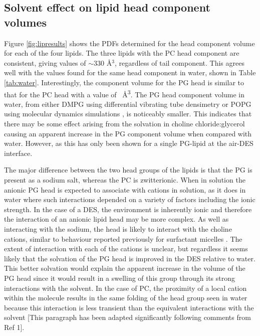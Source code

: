 \documentclass[amsmath,amssymb,twocolumn,superscriptaddress]{revtex4-1}
\begin{document}
\subsection{Solvent effect on lipid head component volumes}
%
Figure \ref{fig:lipresults} shows the PDFs determined for the head component volume for each of the four lipids.
The three lipids with the PC head component are consistent, giving values of $\sim330$ \AA$^3$, regardless of tail component.
This agrees well with the values found for the same head component in water, shown in Table \ref{tab:water}.
Interestingly, the component volume for the PG head is similar to that for the PC head with a value of ~\si{\angstrom\cubed}.
The PG head component volume in water, from either DMPG using differential vibrating tube densimetry \cite{pan_molecular_2012} or POPG using molecular dynamics simulations \cite{kucerka_scattering_2012}, is noticeably smaller.
This indicates that there may be some effect arising from the solvation in choline chloride:glycerol causing an apparent increase in the PG component volume when compared with water.
However, as this has only been shown for a single PG-lipid at the air-DES interface.

The major difference between the two head groups of the lipids is that the PG is present as a sodium salt, whereas the PC is zwitterionic.
When in solution the anionic PG head is expected to associate with cations in solution, as it does in water \cite{grigoriev_effect_1999} where such interactions depended on a variety of factors including the ionic strength.
In the case of a DES, the environment is inherently ionic and therefore the interaction of an anionic lipid head may be more complex.
As well as interacting with the sodium, the head is likely to interact with the choline cations, similar to behaviour reported previously for surfactant micelles \cite{sanchez-fernandez_counterion_2018}.
The extent of interaction with each of the cations is unclear, but regardless it seems likely that the solvation of the PG head is improved in the DES relative to water.
This better solvation would explain the apparent increase in the volume of the PG head since it would result in a swelling of this group through its strong interactions with the solvent.
In the case of PC, the proximity of a local cation within the molecule results in the same folding of the head group seen in water because this interaction is less transient than the equivalent interactions with the solvent [This paragraph has been adapted significantly following comments from Ref 1].
\end{document}
